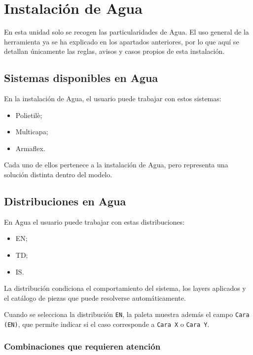 ﻿\section{Instalación de Agua}

\noindent En esta unidad solo se recogen las particularidades de Agua. El uso general de la herramienta ya se ha explicado en los apartados anteriores, por lo que aquí se detallan únicamente las reglas, avisos y casos propios de esta instalación.

\subsection{Sistemas disponibles en Agua}

En la instalación de Agua, el usuario puede trabajar con estos sistemas:

\begin{itemize}
\item Polietilè;
\item Multicapa;
\item Armaflex.
\end{itemize}

Cada uno de ellos pertenece a la instalación de Agua, pero representa una solución distinta dentro del modelo.


\subsection{Distribuciones en Agua}

En Agua el usuario puede trabajar con estas distribuciones:

\begin{itemize}
\item EN;
\item TD;
\item IS.
\end{itemize}

La distribución condiciona el comportamiento del sistema, los layers aplicados y el catálogo de piezas que puede resolverse automáticamente.

Cuando se selecciona la distribución \texttt{EN}, la paleta muestra además el campo \texttt{Cara (EN)}, que permite indicar si el caso corresponde a \texttt{Cara X} o \texttt{Cara Y}.

\subsubsection{Combinaciones que requieren atención}

